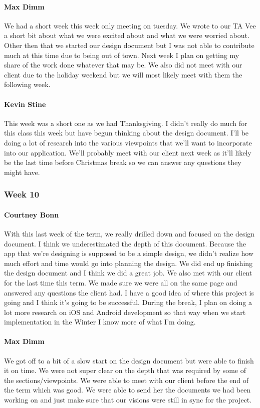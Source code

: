 \documentclass[letterpaper,10pt,draftclsnofoot,onecolumn,titlepage]{IEEEtran}
\begin{document}
			\paragraph{Max Dimm}
			We had a short week this week only meeting on tuesday. We wrote to our TA Vee a short bit about what we were excited about and what we were worried about. Other then that we started our design document but I was not able to contribute much at this time due to being out of town. Next week I plan on getting my share of the work done whatever that may be. We also did not meet with our client due to the holiday weekend but we will most likely meet with them the following week.
			
			\paragraph{Kevin Stine}
			This week was a short one as we had Thanksgiving. I didn't really do much for this class this week but have begun thinking about the design document. I'll be doing a lot of research into the various viewpoints that we'll want to incorporate into our application. We'll probably meet with our client next week as it'll likely be the last time before Christmas break so we can answer any questions they might have.
			
		\subsubsection{Week 10}
		
			\paragraph{Courtney Bonn}
			With this last week of the term, we really drilled down and focused on the design document. I think we underestimated the depth of this document. Because the app that we're designing is supposed to be a simple design, we didn't realize how much effort and time would go into planning the design. We did end up finishing the design document and I think we did a great job. We also met with our client for the last time this term. We made sure we were all on the same page and answered any questions the client had. I have a good idea of where this project is going and I think it's going to be successful. During the break, I plan on doing a lot more research on iOS and Android development so that way when we start implementation in the Winter I know more of what I'm doing.

			\paragraph{Max Dimm}
			We got off to a bit of a slow start on the design document but were able to finish it on time. We were not super clear on the depth that was required by some of the sections/viewpoints. We were able to meet with our client before the end of the term which was good. We were able to send her the documents we had been working on and just make sure that our visions were still in sync for the project.
			
\end{document}
